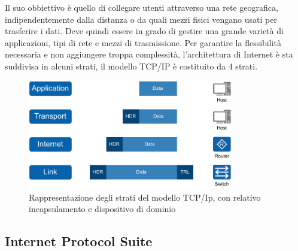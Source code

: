 Il suo obbiettivo è quello di collegare utenti attraverso una rete geografica, indipendentemente dalla distanza o da quali mezzi fisici vengano usati per trasferire i dati. Deve quindi essere in grado di gestire una grande varietà di applicazioni, tipi di rete e mezzi di trasmissione. Per garantire la flessibilità necessaria e non aggiungere troppa complessità, l'architettura di Internet è sta suddivisa in alcuni strati, il modello TCP/IP è costituito da 4 strati. 

\begin{figure}[H]
    \centering
    \includegraphics[width=0.8\textwidth]{immagini/diag2-modello_a_strati}
    \caption{Rappresentazione degli strati del modello TCP/Ip, con relativo incapsulamento e dispositivo di dominio}
    \label{fig:modello-a-strati}
\end{figure}


\subsection{Internet Protocol Suite \ok}

